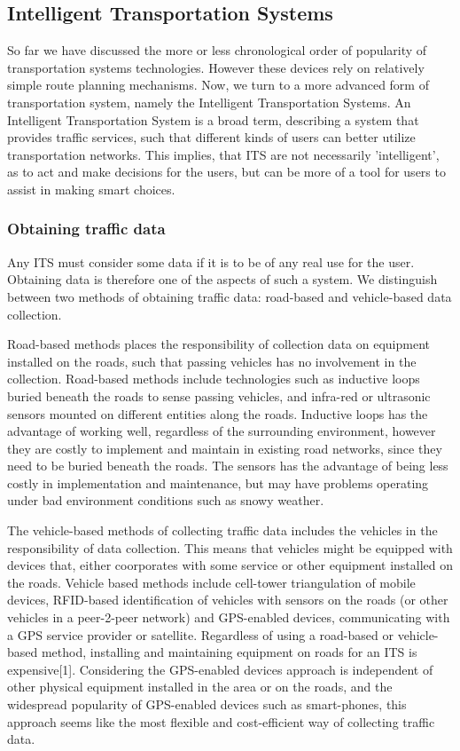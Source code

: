 \subsection*{Intelligent Transportation Systems}
So far we have discussed the more or less chronological order of popularity of transportation systems technologies. However these devices rely on relatively simple route planning mechanisms. Now, we turn to a more advanced form of transportation system, namely the Intelligent Transportation Systems. An Intelligent Transportation System is a broad term, describing a system that provides traffic services, such that different kinds of users can better utilize transportation networks. This implies, that ITS are not necessarily 'intelligent', as to act and make decisions for the users, but can be more of a tool for users to assist in making smart choices.

\subsubsection*{Obtaining traffic data}
Any ITS must consider some data if it is to be of any real use for the user. Obtaining data is therefore one of the aspects of such a system. We distinguish between two methods of obtaining traffic data: road-based and vehicle-based data collection. 

Road-based methods places the responsibility of collection data on equipment installed on the roads, such that passing vehicles has no involvement in the collection. Road-based methods\cite{PIARC0} include technologies such as inductive loops buried beneath the roads to sense passing vehicles, and infra-red or ultrasonic sensors mounted on different entities along the roads. Inductive loops has the advantage of working well, regardless of the surrounding environment, however they are costly to implement and maintain in existing road networks, since they need to be buried beneath the roads. The sensors has the advantage of being less costly in implementation and maintenance, but may have problems operating under bad environment conditions such as snowy weather\cite{KamranHaas2007,PIARC0}.

The vehicle-based methods of collecting traffic data includes the vehicles in the responsibility of data collection. This means that vehicles might be equipped with devices that, either coorporates with some service or other equipment installed on the roads. Vehicle based methods include cell-tower triangulation of mobile devices, RFID-based identification of vehicles with sensors on the roads (or other vehicles in a peer-2-peer network) and GPS-enabled devices, communicating with a GPS service provider or satellite. Regardless of using a road-based or vehicle-based method, installing and maintaining equipment on roads for an ITS is expensive[1]. Considering the GPS-enabled devices approach is independent of other physical equipment installed in the area or on the roads, and the widespread popularity of GPS-enabled devices such as smart-phones, this approach seems like the most flexible and cost-efficient way of collecting traffic data.

